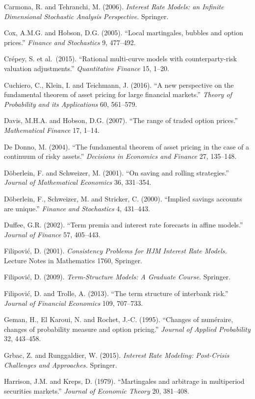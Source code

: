 \documentclass[
]{article}
\begin{document}
Carmona, R. and Tehranchi, M. (2006). \emph{Interest Rate Models: an
Infinite Dimensional Stochastic Analysis Perspective.} Springer.

Cox, A.M.G. and Hobson, D.G. (2005). ``Local martingales, bubbles and
option prices.'' \emph{Finance and Stochastics} 9, 477--492.

Crépey, S. et al.~(2015). ``Rational multi-curve models with
counterparty-risk valuation adjustments.'' \emph{Quantitative Finance}
15, 1--20.

Cuchiero, C., Klein, I. and Teichmann, J. (2016). ``A new perspective on
the fundamental theorem of asset pricing for large financial markets.''
\emph{Theory of Probability and its Applications} 60, 561--579.

Davis, M.H.A. and Hobson, D.G. (2007). ``The range of traded option
prices.'' \emph{Mathematical Finance} 17, 1--14.

De Donno, M. (2004). ``The fundamental theorem of asset pricing in the
case of a continuum of risky assets.'' \emph{Decisions in Economics and
Finance} 27, 135--148.

Döberlein, F. and Schweizer, M. (2001). ``On saving and rolling
strategies.'' \emph{Journal of Mathematical Economics} 36, 331--354.

Döberlein, F., Schweizer, M. and Stricker, C. (2000). ``Implied savings
accounts are unique.'' \emph{Finance and Stochastics} 4, 431--443.

Duffee, G.R. (2002). ``Term premia and interest rate forecasts in affine
models.'' \emph{Journal of Finance} 57, 405--443.

Filipović, D. (2001). \emph{Consistency Problems for HJM Interest Rate
Models.} Lecture Notes in Mathematics 1760, Springer.

Filipović, D. (2009). \emph{Term-Structure Models: A Graduate Course.}
Springer.

Filipović, D. and Trolle, A. (2013). ``The term structure of interbank
risk.'' \emph{Journal of Financial Economics} 109, 707--733.

Geman, H., El Karoui, N. and Rochet, J.-C. (1995). ``Changes of
numéraire, changes of probability measure and option pricing.''
\emph{Journal of Applied Probability} 32, 443--458.

Grbac, Z. and Runggaldier, W. (2015). \emph{Interest Rate Modeling:
Post-Crisis Challenges and Approaches.} Springer.

Harrison, J.M. and Kreps, D. (1979). ``Martingales and arbitrage in
multiperiod securities markets.'' \emph{Journal of Economic Theory} 20,
381--408.
\end{document}
